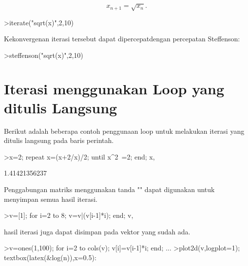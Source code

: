 \documentclass{article}
\newenvironment{eulernotebook}{\par}{\par}
\newcommand{\eulerheading}[1]{\section{#1}}
\newenvironment{eulercomment}{\par\medskip}{\par\medskip}
\newenvironment{eulerformula}{}{}
\begin{document}
\begin{eulernotebook}
\begin{eulercomment}
\begin{eulercomment}
\begin{eulercomment}
\begin{eulercomment}
\begin{eulercomment}
\begin{eulercomment}
\begin{eulercomment}
\end{eulercomment}
\begin{eulerformula}
\[
x_{n+1} = \sqrt{x_n}.
\]
\end{eulerformula}
\begin{eulerprompt}
>iterate("sqrt(x)",2,10)
\end{eulerprompt}
\begin{euleroutput}
  [2,  1.41421,  1.18921,  1.09051,  1.04427,  1.0219,  1.01089,
  1.00543,  1.00271,  1.00135,  1.00068]
\end{euleroutput}
\begin{eulercomment}
Kekonvergenan iterasi tersebut dapat dipercepatdengan percepatan Steffenson:
\end{eulercomment}
\begin{eulerprompt}
>steffenson("sqrt(x)",2,10)
\end{eulerprompt}
\begin{euleroutput}
  [1.04888,  1.00028,  1,  1]
\end{euleroutput}
\eulerheading{Iterasi menggunakan Loop yang ditulis Langsung}
\begin{eulercomment}
Berikut adalah beberapa contoh penggunaan loop untuk melakukan iterasi yang ditulis langsung
pada baris perintah.
\end{eulercomment}
\begin{eulerprompt}
>x=2; repeat x=(x+2/x)/2; until x^2~=2; end; x,
\end{eulerprompt}
\begin{euleroutput}
  1.41421356237
\end{euleroutput}
\begin{eulercomment}
Penggabungan matriks menggunakan tanda "\textbar{}" dapat digunakan untuk menyimpan semua hasil
iterasi.
\end{eulercomment}
\begin{eulerprompt}
>v=[1]; for i=2 to 8; v=v|(v[i-1]*i); end; v,
\end{eulerprompt}
\begin{euleroutput}
  [1,  2,  6,  24,  120,  720,  5040,  40320]
\end{euleroutput}
\begin{eulercomment}
hasil iterasi juga dapat disimpan pada vektor yang sudah ada.
\end{eulercomment}
\begin{eulerprompt}
>v=ones(1,100); for i=2 to cols(v); v[i]=v[i-1]*i; end; ...
>plot2d(v,logplot=1); textbox(latex(&log(n)),x=0.5):
\end{eulerprompt}

\end{eulercomment}
\end{eulercomment}
\end{eulercomment}
\end{eulercomment}
\end{eulercomment}
\end{eulercomment}
\end{eulernotebook}
\end{document}
